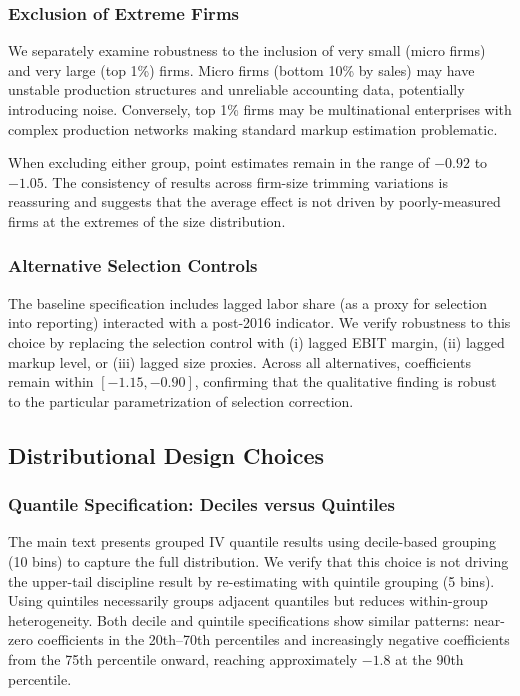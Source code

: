 \documentclass[12pt]{article}
\begin{document}
\subsubsection{Exclusion of Extreme Firms}

We separately examine robustness to the inclusion of very small (micro firms) and very large (top 1\%) firms. Micro firms (bottom 10\% by sales) may have unstable production structures and unreliable accounting data, potentially introducing noise. Conversely, top 1\% firms may be multinational enterprises with complex production networks making standard markup estimation problematic.

When excluding either group, point estimates remain in the range of $-0.92$ to $-1.05$. The consistency of results across firm-size trimming variations is reassuring and suggests that the average effect is not driven by poorly-measured firms at the extremes of the size distribution.

\subsubsection{Alternative Selection Controls}

The baseline specification includes lagged labor share (as a proxy for selection into reporting) interacted with a post-2016 indicator. We verify robustness to this choice by replacing the selection control with (i) lagged EBIT margin, (ii) lagged markup level, or (iii) lagged size proxies. Across all alternatives, coefficients remain within $[-1.15, -0.90]$, confirming that the qualitative finding is robust to the particular parametrization of selection correction.

\subsection{Distributional Design Choices}

\subsubsection{Quantile Specification: Deciles versus Quintiles}

The main text presents grouped IV quantile results using decile-based grouping (10 bins) to capture the full distribution. We verify that this choice is not driving the upper-tail discipline result by re-estimating with quintile grouping (5 bins). Using quintiles necessarily groups adjacent quantiles but reduces within-group heterogeneity. Both decile and quintile specifications show similar patterns: near-zero coefficients in the 20th--70th percentiles and increasingly negative coefficients from the 75th percentile onward, reaching approximately $-1.8$ at the 90th percentile.
\end{document}
